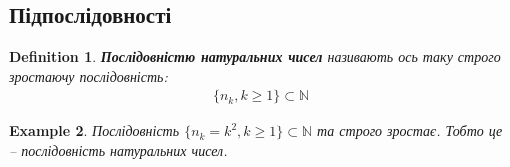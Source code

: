 \documentclass[a4paper, 14pt]{article}
\makeatletter
\def\qed{$\blacksquare$}
\theoremstyle{theoremdd}
\newtheorem{theorem}{Theorem}[subsection]
\theoremstyle{theoremdd}
\newtheorem{definition}[theorem]{Definition}
\theoremstyle{theoremdd}
\theoremstyle{theoremdd}
\newtheorem{example}[theorem]{Example}
\theoremstyle{theoremdd}
\theoremstyle{theoremdd}
\theoremstyle{theoremdd}
\theoremstyle{theoremdd}
\renewenvironment{proof}[1][Proof.\\]{\par
\pushQED{\hfill \qed}%
\normalfont \topsep6\p@\@plus6\p@\relax
\trivlist
\item\relax
{\bfseries
#1\@addpunct{.}}\hspace\labelsep\ignorespaces
}{%
\popQED\endtrivlist\@endpefalse
}
\makeatother
\begin{document}
	\iffalse %
	\begin{theorem}
	$\displaystyle \lim_{n \to \infty} \left( 1 + \dfrac{1}{1!} + \dfrac{1}{2!} + \dots + \dfrac{1}{n!} \right) = e$.
	\end{theorem}

	\begin{proof}
	Ми знаємо, що $\displaystyle \lim_{n \to \infty} \left( 1 + \dfrac{1}{n} \right)^n = e$, розпишемо цю дужку.\\\
	$\left( 1 + \dfrac{1}{n} \right)^n = 1 + C_n^1 \dfrac{1}{n} + C_n^2 \dfrac{1}{n^2} + \dots + C_n^n \dfrac{1}{n^n} = 1 + \dfrac{n}{1!n} + \dfrac{n(n-1)}{2! n^2} + \dots + \dfrac{n(n-1)\dots 1}{n! n^n} < 1 + \dfrac{1}{1!} + \dfrac{1}{2!} + \dots + \dfrac{1}{n!}$\\
	Зафіксуємо $k \in \mathbb{N}$ таким чином, щоб $k < n$. Тоді\\
	$1 + \dfrac{n}{1!n} + \dfrac{n(n-1)}{2!n^2} + \dots + \dfrac{n(n-1)\dots(n-(k-1))}{k!n^k} < 1 + \dfrac{n}{1!n} + \dfrac{n(n-1)}{2! n^2} + \dots + \dfrac{n(n-1)\dots 1}{n! n^n} = \left( 1 + \dfrac{1}{n} \right)^n$\\
	Спрямовуємо $n \to \infty$. Тоді\\
	$1 + \dfrac{1}{1!} + \dfrac{1}{2!} + \dots + \dfrac{1}{k!} \leq e$ - виконано $\forall k \geq 1$.\\
	Таким чином, $\forall n \geq 1: \left(1 + \dfrac{1}{n} \right)^n < 1 + \dfrac{1}{1!} + \dfrac{1}{2!} + \dots + \dfrac{1}{n!} \leq e$.\\
	Спрямовуємо $n \to \infty$. За теоремою про двох поліцаїв, маємо:\\
	$\displaystyle \lim_{n \to \infty} \left( 1 + \dfrac{1}{1!} + \dfrac{1}{2!} + \dots + \dfrac{1}{n!} \right) = e$.
	\end{proof}
	\fi
	
	\subsection{Підпослідовності}
	\begin{definition}
	\textbf{Послідовністю натуральних чисел} називають ось таку строго зростаючу послідовність:
	\begin{align*}
	\{ n_k, k \geq 1 \} \subset \mathbb{N}
	\end{align*}
	\end{definition}
	
	\begin{example}
	Послідовність $\{n_k = k^2, k \geq 1\} \subset \mathbb{N}$ та строго зростає. Тобто це -- послідовність натуральних чисел.
	\end{example}
	
\end{document}
